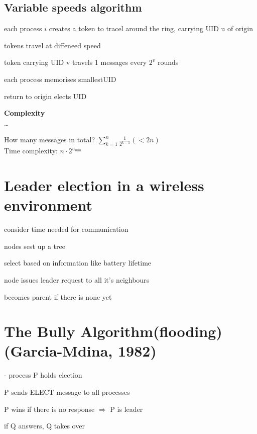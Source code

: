 \documentclass[ngerman,a4paper]{report}
\begin{document}
\subsection{Variable speeds algorithm}
\begin{compactitem}
\item each process $i$ creates a token to tracel around the ring, carrying UID u of origin
\item tokens travel at diffeneed speed
\item token carrying UID v travels  1 messages every $2^{v}$ rounds
\item each process memorises smallestUID
\item return to origin elects UID
\end{compactitem}

\textbf{Complexity}\\
\dots


How many messages in total? $\sum\limits_{k=1}^n \frac{1}{2^{k-1}} (<2n)$\\
Time complexity: $n\cdot 2^{u_{min}}$

\section{Leader election in a wireless environment}
\begin{compactitem}
\item consider time needed for communication
\item nodes sest up a tree
\item select based on information like battery lifetime
\item node issues leader request to all it's neighbours
\item becomes parent if there is none yet
\end{compactitem}

\section{The Bully Algorithm(flooding) (Garcia-Mdina, 1982)}
- process P holds election
\begin{compactenum}
\item P sends ELECT message to all processes
\item P wins if there is no response $\Rightarrow$ P is leader
\item if Q answers, Q takes over
\end{compactenum}
\end{document}
